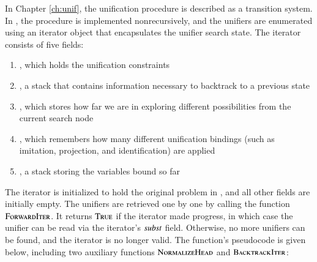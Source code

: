 In Chapter \ref{ch:unif}, the unification procedure is described as a transition system. In
\ehohii{}, the procedure is implemented nonrecursively, and the unifiers are
enumerated using an iterator object that encapsulates the unifier
search state. The iterator consists of five fields:
\begin{enumerate}
  \item {}, which holds the unification
  constraints
  \item {}, a stack that contains information necessary to backtrack
  to a previous state
  \item {}, which stores how far we
  are in exploring different possibilities from the current search node
  \item {}, which remembers how many different unification bindings (such as
  imitation, projection, and identification) are applied
  \item {},
  a stack storing the variables bound so far
\end{enumerate}
\pagebreak[2]
\newcommand{\cn}[1]{\ensuremath{\textsc{#1}}} %
\newcommand{\fc}[1]{\ensuremath{\textsc{#1}}} %
\algrenewcommand{}

The iterator is initialized to hold the original problem in ,
and all other fields are initially empty. The unifiers are retrieved one by one by
calling the function \fc{ForwardIter}. It returns \fc{True} if the iterator made
progress, in which case the unifier can be read via the iterator's
$\mathit{subst}$ field. Otherwise, no more unifiers can be found, and the iterator is
no longer valid. The function's pseudocode is given below, including two
auxiliary functions \fc{NormalizeHead} and \fc{BacktrackIter}:

